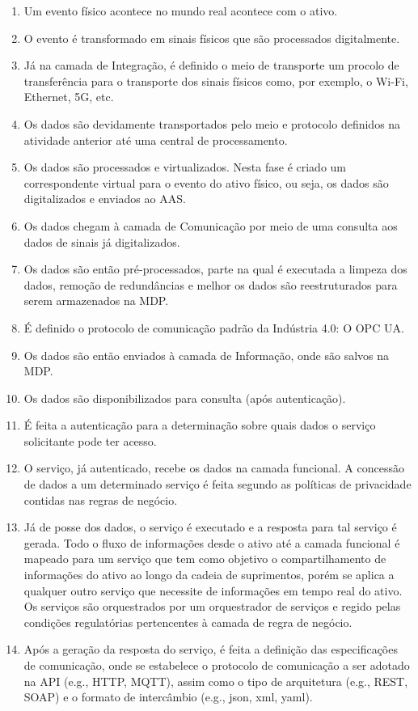 	\begin{enumerate}
		\item Um evento físico acontece no mundo real acontece com o ativo.
		\item O evento é transformado em sinais físicos que são processados digitalmente.
		\item Já na camada de Integração, é definido o meio de transporte um procolo de transferência para o transporte dos sinais físicos como, por exemplo, o Wi-Fi, Ethernet, 5G, etc.
		\item Os dados são devidamente transportados pelo meio e protocolo definidos na atividade anterior até uma central de processamento.
		\item Os dados são processados e virtualizados. Nesta fase é criado um correspondente virtual para o evento do ativo físico, ou seja, os dados são digitalizados e enviados ao AAS.
		\item Os dados chegam à camada de Comunicação por meio de uma consulta aos dados de sinais já digitalizados.
		\item Os dados são então pré-processados, parte na qual é executada a limpeza dos dados, remoção de redundâncias e melhor os dados são reestruturados para serem armazenados na MDP.
		\item É definido o protocolo de comunicação padrão da Indústria 4.0: O OPC UA.
		\item Os dados são então enviados à camada de Informação, onde são salvos na MDP.
		\item Os dados são disponibilizados para consulta (após autenticação).
		\item É feita a autenticação para a determinação sobre quais dados o serviço solicitante pode ter acesso.
		\item O serviço, já autenticado, recebe os dados na camada funcional. A concessão de dados a um determinado serviço é feita segundo as políticas de privacidade contidas nas regras de negócio.
		\item Já de posse dos dados, o serviço é executado e a resposta para tal serviço é gerada. Todo o fluxo de informações desde o ativo até a camada funcional é mapeado para um serviço que tem como objetivo o compartilhamento de informações do ativo ao longo da cadeia de suprimentos, porém se aplica a qualquer outro serviço que necessite de informações em tempo real do ativo. Os serviços são orquestrados por um orquestrador de serviços e regido pelas condições regulatórias pertencentes à camada de regra de negócio.
		\item Após a geração da resposta do serviço, é feita a definição das especificações de comunicação, onde se estabelece o protocolo de comunicação a ser adotado na API (e.g., HTTP, MQTT), assim como o tipo de arquitetura (e.g., REST, SOAP) e o formato de intercâmbio (e.g., json, xml, yaml).

\end{enumerate}
